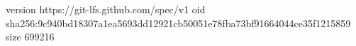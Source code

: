 version https://git-lfs.github.com/spec/v1
oid sha256:9c940bd18307a1ea5693dd12921cb50051e78fba73bf91664044ce35f1215859
size 699216
